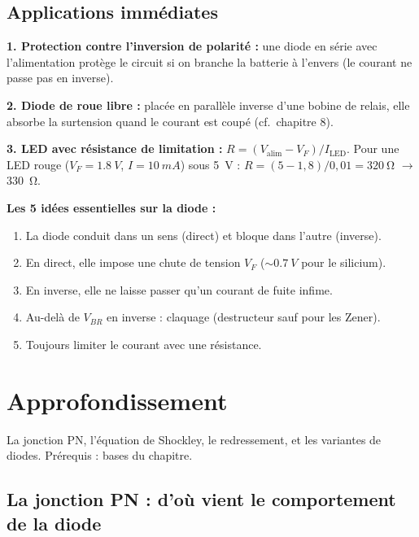 \documentclass[12pt,a4paper,twoside]{book}
\begin{document}
\subsection{Applications immédiates}

\textbf{1. Protection contre l'inversion de polarité :} une diode en série avec l'alimentation protège le circuit si on branche la batterie à l'envers (le courant ne passe pas en inverse).

\textbf{2. Diode de roue libre :} placée en parallèle inverse d'une bobine de relais, elle absorbe la surtension quand le courant est coupé (cf.\ chapitre 8).

\textbf{3. LED avec résistance de limitation :} $R = (V_{\text{alim}} - V_F)/I_{\text{LED}}$. Pour une LED rouge ($V_F = \SI{1.8}{V}$, $I = \SI{10}{mA}$) sous \SI{5}{V} : $R = (5-1{,}8)/0{,}01 = \SI{320}{\ohm}$ $\to$ \SI{330}{\ohm}.

\begin{retenir}
\textbf{Les 5 idées essentielles sur la diode :}
\begin{enumerate}[nosep]
\item La diode conduit dans un sens (direct) et bloque dans l'autre (inverse).
\item En direct, elle impose une chute de tension $V_F$ ($\sim\SI{0.7}{V}$ pour le silicium).
\item En inverse, elle ne laisse passer qu'un courant de fuite infime.
\item Au-delà de $V_{BR}$ en inverse : claquage (destructeur sauf pour les Zener).
\item Toujours limiter le courant avec une résistance.
\end{enumerate}
\end{retenir}

\section{Approfondissement}

\begin{approfondissement}
La jonction PN, l'équation de Shockley, le redressement, et les variantes de diodes. Prérequis : bases du chapitre.
\end{approfondissement}

\subsection{La jonction PN : d'où vient le comportement de la diode}
\end{document}
